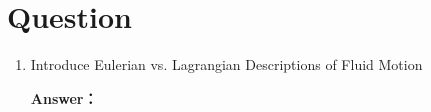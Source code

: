 \documentclass[12pt,a4paper]{article}
\newcounter{question}
\newenvironment{questions}{
    \setcounter{question}{0}
    \section*{Question}
    \begin{enumerate}[leftmargin=1.5em,label={\arabic*．}]
}{
    \end{enumerate}
}
\newcommand{\answer}[1]{\par\noindent\textbf{Answer：} #1\par\vspace{1em}}
\begin{document}
\begin{questions}
  \answer{
  \begin{itemize}
    \item \textbf{Laminar Flow} \\
    Smooth, layered motion with no cross-mixing (low Reynolds number, $Re < 2100$ for pipes).

    \item \textbf{Turbulent Flow} \\
    Chaotic motion with eddies and mixing (high Reynolds number, $Re > 4000$ for pipes).

    \item \textbf{Steady Flow} \\
    Flow parameters (velocity, pressure) remain constant with time ($\frac{\partial}{\partial t} = 0$).

    \item \textbf{Unsteady Flow} \\
    Flow parameters vary with time ($\frac{\partial}{\partial t} \neq 0$), e.g., tidal flows.

    \item \textbf{Uniform Flow} \\
    Velocity remains constant along the flow direction ($\frac{\partial}{\partial s} = 0$).

    \item \textbf{Non-uniform Flow} \\
    Velocity changes along the flow path ($\frac{\partial}{\partial s} \neq 0$), e.g., converging pipes.
\end{itemize}
  }

    \item Introduce Eulerian vs. Lagrangian Descriptions of Fluid Motion
  
    \answer{

}
\end{questions}
\end{document}
